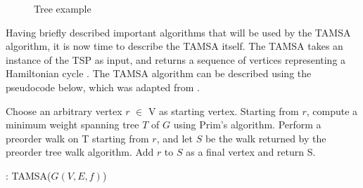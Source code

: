 \documentclass[12pt]{article}
\numberwithin{equation}{subsection}
\numberwithin{table}{subsection}
\numberwithin{algorithm}{subsection}
\numberwithin{figure}{subsection}
\begin{document}
\begin{center}
\begin{figure}[h]
\centering
{}
\caption{Tree example}
\label{tree_example}
\end{figure}
\end{center}
Having briefly described important algorithms that will be used by the TAMSA algorithm, it is now time to describe the TAMSA itself. The TAMSA takes an instance of the TSP as input, and returns a sequence of vertices representing a Hamiltonian cycle \cite{cormen_leiserson_rivest_stein}. The TAMSA algorithm can be described using the pseudocode below, which was adapted from \cite{cormen_leiserson_rivest_stein}.
\begin{algorithm}[H]
\begin{algorithmic}[1]
\State Choose an arbitrary vertex $r$ $\in$ V as starting vertex.
\State Starting from $r$, compute a minimum weight spanning tree $T$ of $G$ using Prim's algorithm.
\State Perform a preorder walk on T starting from $r$, and let $S$ be the walk returned by the preorder tree walk algorithm.
\State Add $r$ to $S$ as a final vertex and return S.
\caption{: TAMSA($G(V,E,f)$)}
\label{tamsa_alg}
\end{algorithmic}
\end{algorithm}
\end{document}
